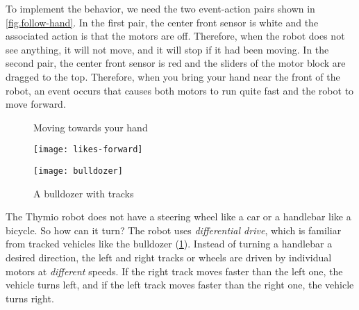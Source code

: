 \label{page.sensors}

To implement the behavior, we need the two event-action pairs shown in
\cref{fig.follow-hand}. In the first pair, the center front sensor
is white and the associated action is that the motors are off.
Therefore, when the robot does not see anything, it will not move, and it
will stop if it had been moving. In the second pair, the center front
sensor is red and the sliders of the motor block are dragged to the top.
Therefore, when you bring your hand near the front of the robot, an event occurs that causes both motors to run quite fast and the robot to move forward.

\begin{figure}
\begin{floatrow}
	\ffigbox
	{\caption{Moving towards your hand}\label{fig.follow-hand}}
	{\texttt{[image: likes-forward]}}
	\ffigbox
	{\caption{A bulldozer with tracks}\label{fig.bull}}
	{\texttt{[image: bulldozer]}}
\end{floatrow}
\end{figure}



The Thymio robot does not have a steering wheel like a car or a
handlebar like a bicycle. So how can it turn? The robot uses
\emph{differential drive}, which is familiar from tracked vehicles like the
bulldozer (\cref{fig.bull}). Instead of turning a handlebar a
desired direction, the left and right tracks or wheels are driven by
individual motors at \emph{different} speeds. If the right track moves
faster than the left one, the vehicle turns left, and if the left track
moves faster than the right one, the vehicle turns right.

